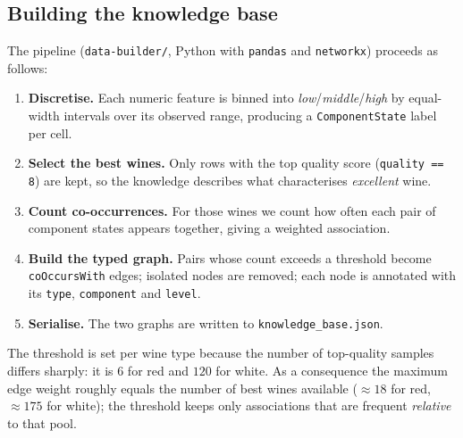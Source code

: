 \documentclass[12pt,a4paper]{article}
\begin{document}
	\subsection*{Building the knowledge base}
	The pipeline (\texttt{data-builder/}, Python with \texttt{pandas} and
	\texttt{networkx}) proceeds as follows:
	\begin{enumerate}
		\item \textbf{Discretise.} Each numeric feature is binned into
		\emph{low}/\emph{middle}/\emph{high} by equal-width intervals over its
		observed range, producing a \texttt{ComponentState} label per cell.
		\item \textbf{Select the best wines.} Only rows with the top quality score
		(\texttt{quality == 8}) are kept, so the knowledge describes what
		characterises \emph{excellent} wine.
		\item \textbf{Count co-occurrences.} For those wines we count how often each
		pair of component states appears together, giving a weighted association.
		\item \textbf{Build the typed graph.} Pairs whose count exceeds a threshold
		become \texttt{coOccursWith} edges; isolated nodes are removed; each node is
		annotated with its \texttt{type}, \texttt{component} and \texttt{level}.
		\item \textbf{Serialise.} The two graphs are written to
		\texttt{knowledge\_base.json}.
	\end{enumerate}
	The threshold is set per wine type because the number of top-quality samples
	differs sharply: it is $6$ for red and $120$ for white. As a consequence the
	maximum edge weight roughly equals the number of best wines available
	($\approx 18$ for red, $\approx 175$ for white); the threshold keeps only
	associations that are frequent \emph{relative} to that pool.
\end{document}

